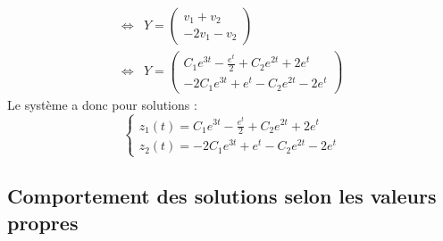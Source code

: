 \begin{ex}
\begin{align*}
    \Leftrightarrow & Y=\begin{pmatrix}v_1 +v_2\\-2v_1-v_2\end{pmatrix}\\
    \Leftrightarrow & Y=\begin{pmatrix}C_1e^{3t}-\frac{e^t}{2}+C_2e^{2t}+2e^t\\-2C_1e^{3t}+e^t-C_2e^{2t}-2e^t\end{pmatrix}
\end{align*}
Le système a donc pour solutions :
$$\begin{cases}
z_1(t)=C_1e^{3t}-\frac{e^t}{2}+C_2e^{2t}+2e^t\\
z_2(t)=-2C_1e^{3t}+e^t-C_2e^{2t}-2e^t
\end{cases}$$
\end{ex}
\subsection{Comportement des solutions selon les valeurs propres}
